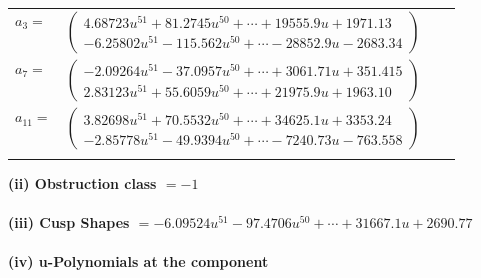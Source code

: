 \documentclass[1p]{elsarticle_modified}
\theoremstyle{definition}
\begin{document}
\begin{tabular}{m{7pt} m{180pt} m{7pt} m{180pt} }
\flushright $a_{3}=$&$\begin{pmatrix}4.68723 u^{51}+81.2745 u^{50}+\cdots+19555.9 u+1971.13\\-6.25802 u^{51}-115.562 u^{50}+\cdots-28852.9 u-2683.34\end{pmatrix}$ \\
\flushright $a_{7}=$&$\begin{pmatrix}-2.09264 u^{51}-37.0957 u^{50}+\cdots+3061.71 u+351.415\\2.83123 u^{51}+55.6059 u^{50}+\cdots+21975.9 u+1963.10\end{pmatrix}$ \\
\flushright $a_{11}=$&$\begin{pmatrix}3.82698 u^{51}+70.5532 u^{50}+\cdots+34625.1 u+3353.24\\-2.85778 u^{51}-49.9394 u^{50}+\cdots-7240.73 u-763.558\end{pmatrix}$\\&\end{tabular}
\flushleft \textbf{(ii) Obstruction class $= -1$}\\~\\
\flushleft \textbf{(iii) Cusp Shapes $= -6.09524 u^{51}-97.4706 u^{50}+\cdots+31667.1 u+2690.77$}\\~\\
\newpage\renewcommand{\arraystretch}{1}
\flushleft \textbf{(iv) u-Polynomials at the component}\newline \\
\end{document}
